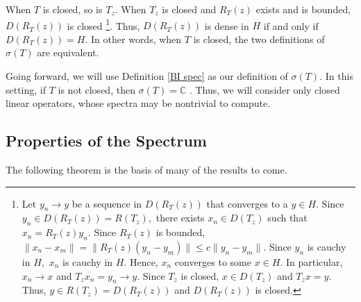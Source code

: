\documentclass[12pt,a4paper]{article}
\theoremstyle{boldthm}
\theoremstyle{bolddefn}
\begin{document}




When $T$ is closed, so is $T_z.$ When $T_z$ is closed and $R_T(z)$ exists and is bounded, $D(R_T(z))$ is closed \footnote{Let $y_n \rightarrow y$ be a sequence in $D(R_T(z))$ that converges to a $y \in H.$ Since $y_n \in D(R_T(z)) = R(T_z),$ there exists $x_n \in D(T_z)$ such that $x_n = R_T(z) y_n.$ Since $R_T(z)$ is bounded, $\| x_n - x_m \| = \|R_T(z) ( y_n - y_m) \|\le c \| y_n - y_m \|.$ Since $y_n$ is cauchy in $H,$ $x_n$ is cauchy in $H.$ Hence, $x_n$ converges to some $x \in H.$ In particular, $x_n \rightarrow x$ and $T_z x_n  = y_n \rightarrow y.$ Since $T_z$ is closed, $x \in D(T_z)$ and $T_z x = y.$ Thus, $y \in R(T_z) = D(R_T(z))$ and $D(R_T(z))$ is closed.}. 
Thus, $D(R_T(z))$ is dense in $H$ if and only if $D(R_T(z)) = H.$ In other words, when $T$ is closed, the two definitions of $\sigma(T)$ are equivalent. 

Going forward, we will use Definition \ref{BI spec} as our definition of $\sigma(T).$ In this setting, if  $T$ is not closed, then $\sigma(T) = \mathbb{C}$ \cite{Matt}. Thus, we will consider only closed linear operators, whose spectra may be nontrivial to compute.


\subsection{Properties of the Spectrum}

The following theorem is the basis of many of the results to come. 
\end{document}
